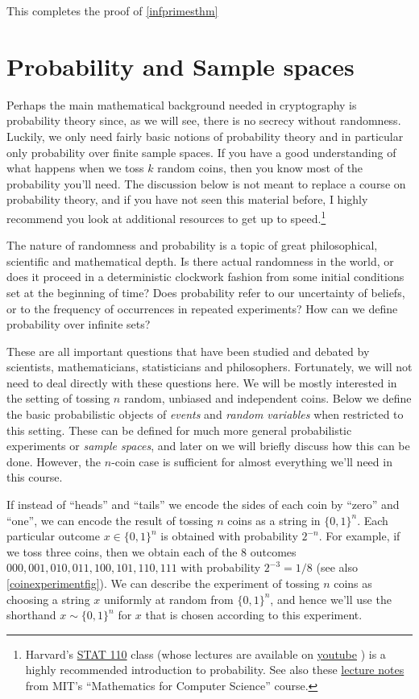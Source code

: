 This completes the proof of \cref{infprimesthm}

\section{Probability and Sample spaces}\label{Probability-and-Sample-sp}

Perhaps the main mathematical background needed in cryptography is
probability theory since, as we will see, there is no secrecy without
randomness. Luckily, we only need fairly basic notions of probability
theory and in particular only probability over finite sample spaces. If
you have a good understanding of what happens when we toss \(k\) random
coins, then you know most of the probability you'll need. The discussion
below is not meant to replace a course on probability theory, and if you
have not seen this material before, I highly recommend you look at
additional resources to get up to speed.\footnote{Harvard's
  \href{http://projects.iq.harvard.edu/stat110/home}{STAT 110} class
  (whose lectures are available on
  \href{http://projects.iq.harvard.edu/stat110/youtube}{youtube} ) is a
  highly recommended introduction to probability. See also these
  \href{http://www.boazbarak.org/cs121/LLM_probability.pdf}{lecture
  notes} from MIT's ``Mathematics for Computer Science'' course.}

The nature of randomness and probability is a topic of great
philosophical, scientific and mathematical depth. Is there actual
randomness in the world, or does it proceed in a deterministic clockwork
fashion from some initial conditions set at the beginning of time? Does
probability refer to our uncertainty of beliefs, or to the frequency of
occurrences in repeated experiments? How can we define probability over
infinite sets?

These are all important questions that have been studied and debated by
scientists, mathematicians, statisticians and philosophers. Fortunately,
we will not need to deal directly with these questions here. We will be
mostly interested in the setting of tossing \(n\) random, unbiased and
independent coins. Below we define the basic probabilistic objects of
\emph{events} and \emph{random variables} when restricted to this
setting. These can be defined for much more general probabilistic
experiments or \emph{sample spaces}, and later on we will briefly
discuss how this can be done. However, the \(n\)-coin case is sufficient
for almost everything we'll need in this course.

If instead of ``heads'' and ``tails'' we encode the sides of each coin
by ``zero'' and ``one'', we can encode the result of tossing \(n\) coins
as a string in \(\{0,1\}^n\). Each particular outcome \(x\in \{0,1\}^n\)
is obtained with probability \(2^{-n}\). For example, if we toss three
coins, then we obtain each of the 8 outcomes
\(000,001,010,011,100,101,110,111\) with probability \(2^{-3}=1/8\) (see
also \cref{coinexperimentfig}). We can describe the experiment of
tossing \(n\) coins as choosing a string \(x\) uniformly at random from
\(\{0,1\}^n\), and hence we'll use the shorthand \(x\sim \{0,1\}^n\) for
\(x\) that is chosen according to this experiment.


